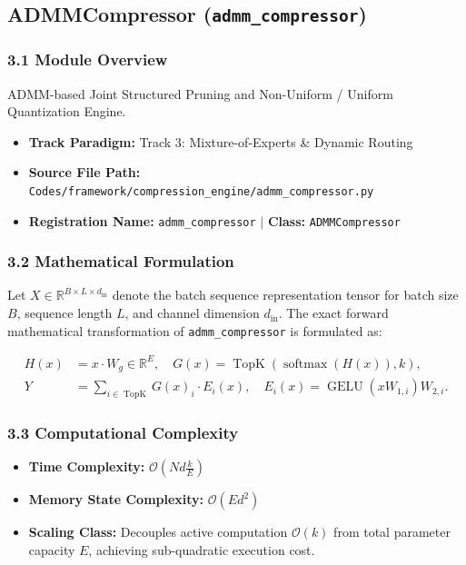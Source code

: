 \subsection{ADMMCompressor (\texttt{admm\_compressor})}
\label{sec:app_module_admm_compressor}

\subsubsection*{3.1 Module Overview}
ADMM-based Joint Structured Pruning and Non-Uniform / Uniform Quantization Engine.
\begin{itemize}
    \item \textbf{Track Paradigm:} Track 3: Mixture-of-Experts & Dynamic Routing
    \item \textbf{Source File Path:} \texttt{Codes/framework/compression\_engine/admm\_compressor.py}
    \item \textbf{Registration Name:} \texttt{admm\_compressor} $\mid$ \textbf{Class:} \texttt{ADMMCompressor}
\end{itemize}

\subsubsection*{3.2 Mathematical Formulation}
Let $X \in \mathbb{R}^{B \times L \times d_{\text{in}}}$ denote the batch sequence representation tensor for batch size $B$, sequence length $L$, and channel dimension $d_{\text{in}}$. The exact forward mathematical transformation of \texttt{admm\_compressor} is formulated as:

\begin{align}
H(x) &= x \cdot W_g \in \mathbb{R}^{E}, \quad G(x) = \operatorname{TopK}\left(\operatorname{softmax}(H(x)), k\right), \\
Y &= \sum_{i \in \operatorname{TopK}} G(x)_i \cdot E_i(x), \quad E_i(x) = \operatorname{GELU}(x W_{1, i}) W_{2, i}.
\end{align}


\subsubsection*{3.3 Computational Complexity}
\begin{itemize}
    \item \textbf{Time Complexity:} $\mathcal{O}(N d \frac{k}{E})$
    \item \textbf{Memory State Complexity:} $\mathcal{O}(E d^2)$
    \item \textbf{Scaling Class:} Decouples active computation $\mathcal{O}(k)$ from total parameter capacity $E$, achieving sub-quadratic execution cost.
\end{itemize}

